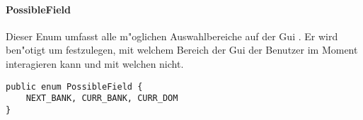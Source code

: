\paragraph{PossibleField}
\label{par:possibleField}
Dieser Enum umfasst alle m"oglichen Auswahlbereiche auf der Gui . Er wird ben"otigt um festzulegen, mit welchem Bereich der Gui der Benutzer im Moment interagieren kann und mit welchen nicht. 

\begin{lstlisting}[float,style=CodeHighlighting,caption=Enum - PossibleField,label=lst:possibleField]
public enum PossibleField {
    NEXT_BANK, CURR_BANK, CURR_DOM
}
\end{lstlisting}
